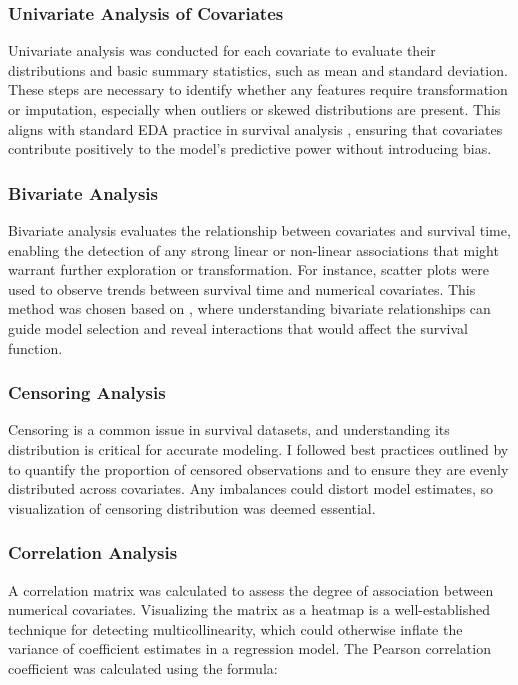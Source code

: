 \subsubsection*{Univariate Analysis of Covariates}

Univariate analysis was conducted for each covariate to evaluate their distributions and basic summary statistics, such as mean and standard deviation. These steps are necessary to identify whether any features require transformation or imputation, especially when outliers or skewed distributions are present. This aligns with standard EDA practice in survival analysis \parencite{burzykowski_survival_2024}, ensuring that covariates contribute positively to the model's predictive power without introducing bias.

\subsubsection*{Bivariate Analysis}

Bivariate analysis evaluates the relationship between covariates and survival time, enabling the detection of any strong linear or non-linear associations that might warrant further exploration or transformation. For instance, scatter plots were used to observe trends between survival time and numerical covariates. This method was chosen based on \parencite{harrell__regression_2015}, where understanding bivariate relationships can guide model selection and reveal interactions that would affect the survival function.

\subsubsection*{Censoring Analysis}

Censoring is a common issue in survival datasets, and understanding its distribution is critical for accurate modeling. I followed best practices outlined by \parencite{kalbfleisch_fifty_2023} to quantify the proportion of censored observations and to ensure they are evenly distributed across covariates. Any imbalances could distort model estimates, so visualization of censoring distribution was deemed essential.

\subsubsection*{Correlation Analysis}

A correlation matrix was calculated to assess the degree of association between numerical covariates. Visualizing the matrix as a heatmap is a well-established technique for detecting multicollinearity, which could otherwise inflate the variance of coefficient estimates in a regression model. The Pearson correlation coefficient was calculated using the formula:

